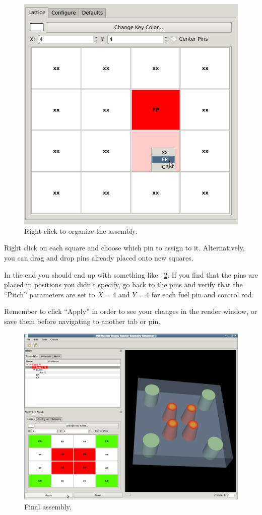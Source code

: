 \begin{figure}[htb]
\begin{center}
\includegraphics[width=0.4\linewidth]{Images/rect-9e1.png}
\caption{Right-click to organize the assembly.}
\label{fig:Rect9}
\end{center}
\end{figure}
Right click on each square and choose which pin to assign to it.  Alternatively, you can drag and drop pins already placed onto new squares.

In the end you should end up with something like ~\ref{fig:Rect10}.  If you find that the pins are placed in positions you didn't specify, go back to the pins and verify that the ``Pitch'' parameters are set to $X=4$ and $Y=4$ for each fuel pin and control rod.

Remember to click ``Apply'' in order to see your changes in the render window, or save them before navigating to another tab or pin.

\begin{figure}[htb]
\begin{center}
\includegraphics[width=0.7\linewidth]{Images/rect-10.png}
\caption{Final assembly.}
\label{fig:Rect10}
\end{center}
\end{figure}

